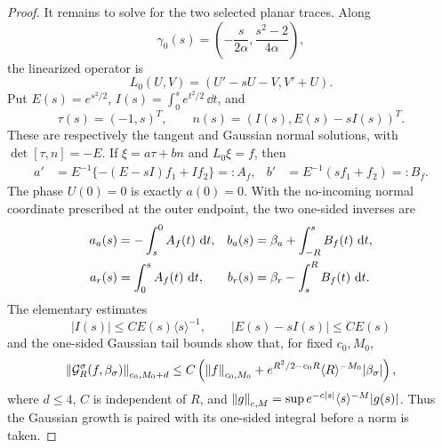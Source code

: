 \begin{proof}
It remains to solve for the two selected planar traces.  Along
\[
 \gamma_0(s)=\left(-\frac{s}{2\alpha},
                    \frac{s^2-2}{4\alpha}\right),
\]
the linearized operator is
\[
 L_0(U,V)=(U'-sU-V,V'+U).
\]
Put \(E(s)=e^{s^2/2}\),
\(I(s)=\int_0^se^{t^2/2}\,\dd t\), and
\[
 \tau(s)=(-1,s)^T,
 \qquad n(s)=(I(s),E(s)-sI(s))^T.
\]
These are respectively the tangent and Gaussian normal solutions, with
\(\det[\tau,n]=-E\).  If \(\xi=a\tau+bn\) and \(L_0\xi=f\), then
\begin{align}
 a'&=E^{-1}\{-(E-sI)f_1+If_2\}=:A_f,&
 b'&=E^{-1}(sf_1+f_2)=:B_f.                           \label{eq:shared-ab}
\end{align}
The phase \(U(0)=0\) is exactly \(a(0)=0\).  With the no-incoming normal
coordinate prescribed at the outer endpoint, the two one-sided inverses are
\begin{align}
 a_a(s)&=-\int_s^0A_f(t)\,\,\mathrm d t,&
 b_a(s)&=\beta_a+\int_{-R}^sB_f(t)\,\,\mathrm d t,\notag\\
 a_r(s)&= \int_0^sA_f(t)\,\,\mathrm d t,&
 b_r(s)&=\beta_r-\int_s^RB_f(t)\,\,\mathrm d t.               \label{eq:shared-one-sided-green}
\end{align}
The elementary estimates
\[
 |I(s)|\le CE(s)\langle s\rangle^{-1},
 \qquad |E(s)-sI(s)|\le CE(s)
\]
and the one-sided Gaussian tail bounds show that, for fixed \(c_0,M_0\),
\begin{equation}
 \left\lVert\mathcal G_R^\sigma(f,\beta_\sigma)\right\rVert_{c_0,M_0+d}
 \le C\left(\left\lVert f\right\rVert_{c_0,M_0}
 +e^{R^2/2-c_0R}\langle R\rangle^{-M_0}|\beta_\sigma|\right),
                                                               \label{eq:shared-green-bound}
\end{equation}
where \(d\le4\), \(C\) is independent of \(R\), and
\(\left\lVert g\right\rVert_{c,M}=\sup e^{-c|s|}\langle s\rangle^{-M}|g(s)|\).
Thus the Gaussian growth is paired with its one-sided integral before a
norm is taken.


\end{proof}
